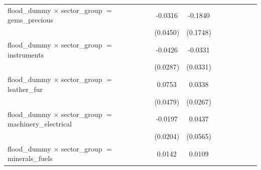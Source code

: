 \begin{tabular}{lcccccccc}
   flood\_dummy $\times$ sector\_group $=$ gems\_precious                         & -0.0316               & -0.1840               &                       &                       &                       &                       &                       &   \\   
                                                                                  & (0.0450)              & (0.1748)              &                       &                       &                       &                       &                       &   \\   
   flood\_dummy $\times$ sector\_group $=$ instruments                            & -0.0426               & -0.0331               &                       &                       &                       &                       &                       &   \\   
                                                                                  & (0.0287)              & (0.0331)              &                       &                       &                       &                       &                       &   \\   
   flood\_dummy $\times$ sector\_group $=$ leather\_fur                           & 0.0753                & 0.0338                &                       &                       &                       &                       &                       &   \\   
                                                                                  & (0.0479)              & (0.0267)              &                       &                       &                       &                       &                       &   \\   
   flood\_dummy $\times$ sector\_group $=$ machinery\_electrical                  & -0.0197               & 0.0437                &                       &                       &                       &                       &                       &   \\   
                                                                                  & (0.0204)              & (0.0565)              &                       &                       &                       &                       &                       &   \\   
   flood\_dummy $\times$ sector\_group $=$ minerals\_fuels                        & 0.0142                & 0.0109                &                       &                       &                       &                       &                       &   \\   

\end{tabular}
